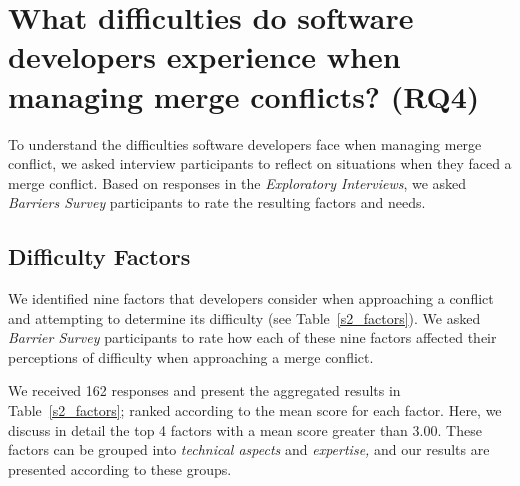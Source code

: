 
\vspace*{1.8\baselineskip}
\section{What difficulties do software developers experience when managing merge conflicts? (RQ4)}\label{RQ4}

To understand the difficulties software developers face when managing merge conflict, we asked interview participants to reflect on situations when they faced a merge conflict.
Based on responses in the \textit{Exploratory Interviews}, we asked \textit{Barriers Survey} participants to rate the resulting factors and needs.

\subsection{Difficulty Factors}\label{difficulty-factors}

We identified nine factors that developers consider when approaching a conflict and attempting to determine its difficulty (see Table~\ref{s2_factors}).
We asked \textit{Barrier Survey} participants to rate how each of these nine factors affected their perceptions of difficulty when approaching a merge conflict.

We received 162 responses and present the aggregated results in Table~\ref{s2_factors}; ranked according to the mean score for each factor.
Here, we discuss in detail the top 4 factors with a mean score greater than $3.00$.
These factors can be grouped into \textit{technical aspects} and \textit{expertise,} and our results are presented according to these groups.


